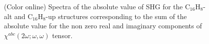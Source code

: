 \documentclass[pss]{wiley2sp} %
\begin{document}
\begin{figure}[t]
\hfill
{}
\caption{(Color online) Spectra of the absolute value of SHG for the C$_{16}$H$_{8}$-alt 
    and C$_{16}$H$_{8}$-up structures corresponding to the sum of the absolute 
    value for the non zero real and imaginary components of $\chi^{abc}(2\omega;\omega,
    \omega) $ tensor.\label{fig:shg-abs-both}}
\end{figure}
\end{document}
